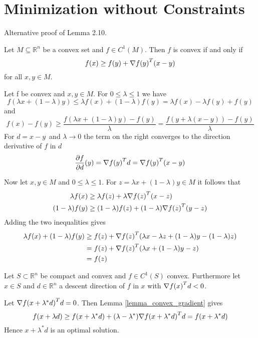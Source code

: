 
\newpage
\section{Minimization without Constraints}

Alternative proof of Lemma 2.10.

\lemma{}\label{lemma_convex_gradient}
Let \(M \subseteq \mathbb{R}^n\) be a convex set and \(f \in C^1(M)\). Then \(f\) is convex if and only if
\[
    f(x) \ge f(y) + \nabla {f(y)}^T (x - y)
\]
for all \(x, y \in M \). 

\proof{}
Let f be convex and \(x, y \in M\). For \( 0 \le \lambda \le 1 \) we have
\[ 
    f(\lambda x + (1 - \lambda) y) \le \lambda f(x) + (1 - \lambda)f(y) =  \lambda f(x) - \lambda f(y) + f(y) 
\] 
and 
\[ 
    f(x) - f(y) \ge \frac{f(\lambda x + (1 - \lambda) y) - f(y)}{\lambda}
        = \frac{f(y + \lambda (x - y)) - f(y)}{\lambda}
\]
For \( d = x - y \)\ and \( \lambda \to 0 \) the term on the right converges to the direction derivative of \( f \)
in \( d \)
\[
    \frac{\partial f}{\partial d}(y) = \nabla{f(y)}^T d = \nabla{f(y)}^T (x - y) 
\]

Now let \( x, y \in M \) and  \( 0 \le \lambda \le 1 \). For \( z = \lambda x + (1 - \lambda) y \in M \) it follows that
\[
    \begin{split}
    \lambda f(x) & \ge \lambda f(z) + \lambda \nabla {f(z)}^T (x - z) \\
    (1 - \lambda) f(y) & \ge (1 - \lambda) f(z) + (1 - \lambda) \nabla {f(z)}^T (y - z)
    \end{split}
\]
Adding the two inequalities gives
\[
    \begin{split}
       \lambda f(x) + (1 - \lambda) f(y) 
        & \ge f(z) + \nabla {f(z)}^T(\lambda x - \lambda z + (1- \lambda) y - (1-\lambda)z) \\
        & = f(z) + \nabla {f(z)}^T(\lambda x + (1- \lambda) y - z) \\
        & = f(z)
    \end{split}
\]


\exercise{}
Let \( S \subset \mathbb{R}^n \) be compact and convex and \( f \in C^1(S) \) convex. 
Furthermore let \( x \in S \) and \( d \in \mathbb{R}^n \) a descent direction of \( f \) in \( x \) 
with \( \nabla {f(x)}^T d < 0 \).

\proof{}
Let \( \nabla {f(x + \lambda^* d)}^T d = 0 \). Then Lemma \ref{lemma_convex_gradient} gives
\[
    f(x + \lambda d) \ge f(x + \lambda^* d) + (\lambda - \lambda^*) \nabla {f(x + \lambda^* d)}^T d 
        = f(x + \lambda^* d) 
\]
Hence \( x + \lambda^* d \) is an optimal solution.

